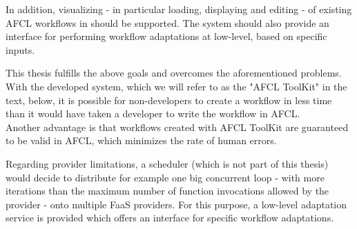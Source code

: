 \documentclass[a4paper,top=25mm,bottom=25mm,12pt,pdftex,halfparskip,twoside,bibtotoc,numbers=noenddot]{scrbook}
\begin{document}
In addition, visualizing - in particular loading, displaying and editing - of existing AFCL workflows in should be supported.
The system should also provide an interface for performing workflow adaptations at low-level, based on specific inputs.

This thesis fulfills the above goals and overcomes the aforementioned problems.
With the developed system, which we will refer to as the "AFCL ToolKit" in the text, below, it is possible for non-developers to create a workflow in less time than it would have taken a developer to write the workflow in AFCL.\\
Another advantage is that workflows created with AFCL ToolKit are guaranteed to be valid in AFCL, which minimizes the rate of human errors.

Regarding provider limitations, a scheduler (which is not part of this thesis) would decide to distribute for example one big concurrent loop - with more iterations than the maximum number of function invocations allowed by the provider - onto multiple FaaS providers. For this purpose, a low-level adaptation service is provided which offers an interface for specific workflow adaptations.


\end{document}
